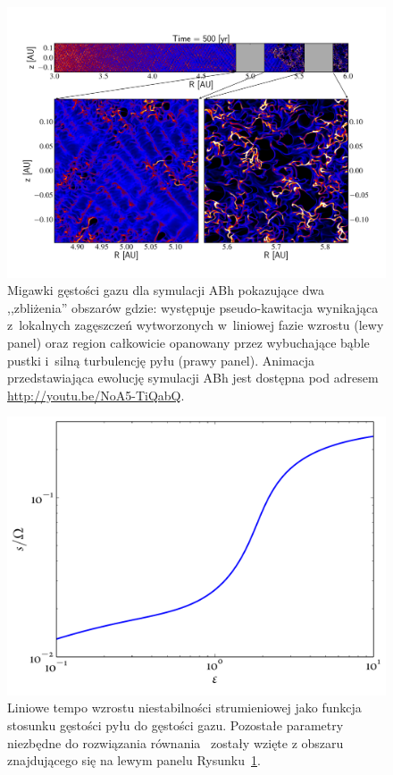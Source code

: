 \begin{figure} 
\centering
\includegraphics[width=0.98\linewidth]{figures/fig3}
\caption{Migawki gęstości gazu dla symulacji ABh pokazujące dwa ,,zbliżenia''
   obszarów gdzie: występuje pseudo-kawitacja wynikająca z~lokalnych zagęszczeń
   wytworzonych w~liniowej fazie wzrostu (lewy panel) oraz region całkowicie
   opanowany przez wybuchające bąble pustki i~silną turbulencję pyłu (prawy
   panel). Animacja przedstawiająca ewolucję symulacji ABh jest dostępna pod
   adresem \href{http://youtu.be/NoA5-TiQabQ}{http://youtu.be/NoA5-TiQabQ}.}
\label{fig3}
\end{figure}

\begin{figure}
   \centering
   \includegraphics[width=0.5\linewidth]{figures/growthAB}
   \caption{Liniowe tempo wzrostu niestabilności strumieniowej jako funkcja
      stosunku gęstości pyłu do gęstości gazu. Pozostałe parametry niezbędne do
      rozwiązania równania~ zostały wzięte z obszaru znajdującego
      się na lewym panelu Rysunku~\ref{fig3}.}
   \label{fig2b}
\end{figure}


